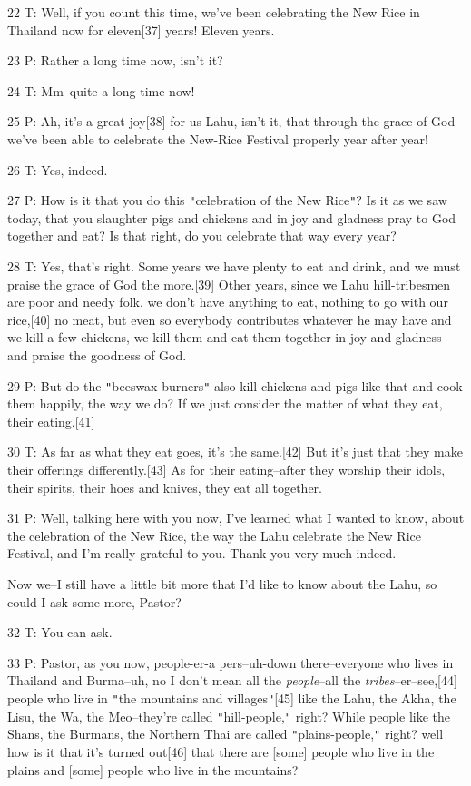 {22 T: Well, if you count this time, we've been celebrating the New Rice
in Thailand now for eleven[37] years! Eleven years.}

{23 P: Rather a long time now, isn't it?}

{24 T: Mm--quite a long time now! }

{25 P: Ah, it's a great joy[38] for us Lahu, isn't it, that through the
grace of God we've been able to celebrate the New-Rice Festival properly year after
year! }

{26 T: Yes, indeed.}

{27 P: How is it that you do this \texttt{"}celebration of the New Rice\texttt{"}?
Is it as we saw today, that you slaughter pigs and chickens and in joy and gladness
pray to God together and eat? Is that right, do you celebrate that way every year?
}

{28 T: Yes, that's right. Some years we have plenty to eat and drink, and
we must praise the grace of God the more.[39] Other years, since we Lahu hill-tribesmen
are poor and needy folk, we don't have anything to eat, nothing to go with our
rice,[40] no meat, but even so everybody contributes whatever he may have and we
kill a few chickens, we kill them and eat them together in joy and gladness and
praise the goodness of God. }

{29 P: But do the \texttt{"}beeswax-burners\texttt{"} also kill chickens
and pigs like that and cook them happily, the way we do? If we just consider the
matter of what they eat, their eating.[41]}

{30 T: As far as what they eat goes, it's the same.[42] But it's just that
they make their offerings differently.[43] As for their eating--after they worship
their idols, their spirits, their hoes and knives, they eat all together. }

{31 P: Well, talking here with you now, I've learned what I wanted to know,
about the celebration of the New Rice, the way the Lahu celebrate the New Rice
Festival, and I'm really grateful to you. Thank you very much indeed. }

{Now we--I still have a little bit more that I'd like to know about the
Lahu, so could I ask some more, Pastor?}

{32 T: You can ask.}

{33 P: Pastor, as you now, people-er-a pers--uh-down there--everyone who
lives in Thailand and Burma--uh, no I don't mean all the }{\textit{people}}{--all
the }{\textit{tribes}}{--er--see,[44] people who live in \texttt{"}the
mountains and villages\texttt{"}[45] like the Lahu, the Akha, the Lisu, the Wa,
the Meo--they're called \texttt{"}hill-people,\texttt{"} right? While people like
the Shans, the Burmans, the Northern Thai are called \texttt{"}plains-people,\texttt{"}
right? well how is it that it's turned out[46] that there are [some] people who
live in the plains and [some] people who live in the mountains? }

